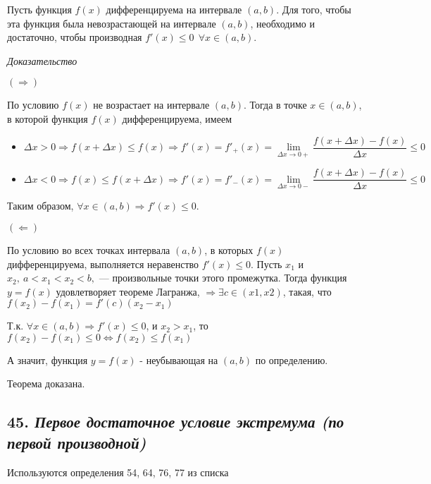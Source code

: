 Пусть функция $f(x)$ дифференцируема на интервале $(a, b)$. Для того, чтобы эта функция была невозрастающей на интервале $(a, b)$, необходимо и достаточно, чтобы производная $f'(x) \leqslant 0 \ \ \forall x \in (a, b).$
\vspace*{20pt} 

\textit{Доказательство}

$(\Rightarrow)$

По условию $f(x)$ не возрастает на интервале $(a, b)$. Тогда в точке $x \in (a, b)$, в которой функция $f(x)$ дифференцируема, имеем
\begin{itemize}

\item $\Delta x > 0\Rightarrow f(x + \Delta x) \leqslant f(x) \Rightarrow f'(x) = f'_+(x) = \lim\limits_{\Delta x \to 0+ }{\dfrac{f(x + \Delta x) - f(x)}{\Delta x}} \leqslant 0$
\item $\Delta x < 0\Rightarrow f(x) \leqslant f(x + \Delta x) \Rightarrow f'(x) = f'_-(x) = \lim\limits_{\Delta x \to 0-}{\dfrac{f(x + \Delta x) - f(x)}{\Delta x}} \leqslant 0$

\end{itemize}

Таким образом, $\forall x \in (a, b) \Rightarrow f'(x) \leqslant 0$.

$(\Leftarrow)$

По условию во всех точках интервала $(a,b)$, в которых $f(x)$ дифференцируема, выполняется неравенство $f'(x) \leqslant 0$. Пусть $x_1$ и $x_2,\ a < x_1 < x_2 < b,$ — произвольные точки этого промежутка. Тогда функция $y = f(x)$ удовлетворяет теореме Лагранжа, $\Rightarrow  \exists c \in (x1, x2)$, такая, что $f(x_2) - f(x_1) = f'(c)(x_2 - x_1)$

Т.к. $\forall x \in (a, b) \Rightarrow f'(x) \leqslant 0$, и $x_2 > x_1$, то $f(x_2) - f(x_1) \leqslant 0 \iff f(x_2) \leqslant  f(x_1)$

А значит, функция $y = f(x)$ - неубывающая на $(a, b)$ по определению.

Теорема доказана.
\newpage 
\subsection*{45. \textit{Первое достаточное условие экстремума (по первой производной)}}
\begin{Quote2} 
\small\centering 

Используются определения 54, 64, 76, 77 из списка \end{Quote2} 

